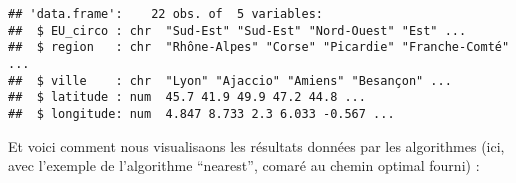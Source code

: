 \documentclass[
]{article}
\newenvironment{Shaded}{\begin{snugshade}}{\end{snugshade}}
\newcommand{\AttributeTok}[1]{\textcolor[rgb]{0.77,0.63,0.00}{#1}}
\newcommand{\DecValTok}[1]{\textcolor[rgb]{0.00,0.00,0.81}{#1}}
\newcommand{\FunctionTok}[1]{\textcolor[rgb]{0.00,0.00,0.00}{#1}}
\newcommand{\NormalTok}[1]{#1}
\newcommand{\OtherTok}[1]{\textcolor[rgb]{0.56,0.35,0.01}{#1}}
\newcommand{\SpecialCharTok}[1]{\textcolor[rgb]{0.00,0.00,0.00}{#1}}
\newcommand{\StringTok}[1]{\textcolor[rgb]{0.31,0.60,0.02}{#1}}
\begin{document}
\begin{verbatim}
## 'data.frame':    22 obs. of  5 variables:
##  $ EU_circo : chr  "Sud-Est" "Sud-Est" "Nord-Ouest" "Est" ...
##  $ region   : chr  "Rhône-Alpes" "Corse" "Picardie" "Franche-Comté" ...
##  $ ville    : chr  "Lyon" "Ajaccio" "Amiens" "Besançon" ...
##  $ latitude : num  45.7 41.9 49.9 47.2 44.8 ...
##  $ longitude: num  4.847 8.733 2.3 6.033 -0.567 ...
\end{verbatim}

Et voici comment nous visualisaons les résultats données par les
algorithmes (ici, avec l'exemple de l'algorithme ``nearest'', comaré au
chemin optimal fourni) :

\begin{Shaded}
\end{Shaded}
\end{document}
